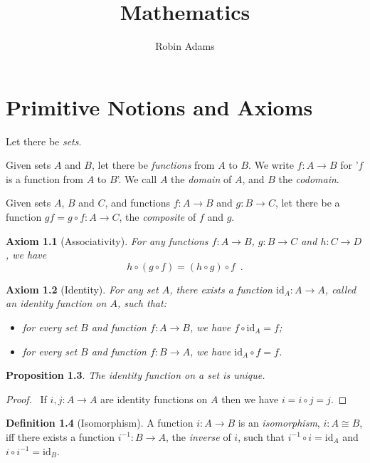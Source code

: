 \documentclass{book}
\title{Mathematics}
\author{Robin Adams}
\let\qed\relax
\newtheorem{ax}{Axiom}[chapter]
\newtheorem{prop}[ax]{Proposition}
\theoremstyle{definition}
\newtheorem{df}[ax]{Definition}
\newcommand{\id}[1]{\ensuremath{\mathrm{id}_{#1}}}
\newcommand{\inv}[1]{\ensuremath{{#1}^{-1}}}
\begin{document}
\maketitle
\tableofcontents

\chapter{Primitive Notions and Axioms}

Let there be \emph{sets}.

Given sets $A$ and $B$, let there be \emph{functions} from $A$ to $B$. We write $f : A \rightarrow B$ for '$f$ is a function from $A$ to $B$'. We call $A$ the \emph{domain} of $A$, and $B$ the \emph{codomain}.

Given sets $A$, $B$ and $C$, and functions $f : A \rightarrow B$ and $g : B \rightarrow C$, let there be a function $gf = g \circ f : A \rightarrow C$, the \emph{composite} of $f$ and $g$.

\begin{ax}[Associativity]
For any functions $f : A \rightarrow B$, $g : B \rightarrow C$ and $h : C \rightarrow D$, we have
\[ h \circ (g \circ f) = (h \circ g) \circ f \enspace . \]
\end{ax}

\begin{ax}[Identity]
For any set $A$, there exists a function $\id{A} : A \rightarrow A$, called an \emph{identity} function on $A$, such that:
\begin{itemize}
\item for every set $B$ and function $f : A \rightarrow B$, we have $f \circ \id{A} = f$;
\item for every set $B$ and function $f : B \rightarrow A$, we have $\id{A} \circ f = f$.
\end{itemize}
\end{ax}

\begin{prop}
The identity function on a set is unique.
\end{prop}

\begin{proof}
\pf\ If $i, j : A \rightarrow A$ are identity functions on $A$ then we have $i = i \circ j = j$. \qed
\end{proof}

\begin{df}[Isomorphism]
A function $i : A \rightarrow B$ is an \emph{isomorphism}, $i : A \cong B$, iff there exists a function $\inv{i} : B \rightarrow A$, the \emph{inverse} of $i$, such that $\inv{i} \circ i = \id{A}$ and $i \circ \inv{i} = \id{B}$.
\end{df}
\end{document}
